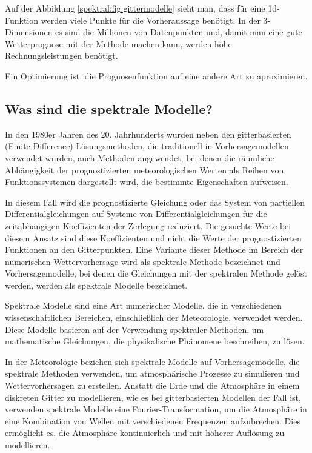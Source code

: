 Auf der Abbildung \ref{spektral:fig:gittermodelle} sieht man, dass für eine 1d-Funktion werden viele Punkte für die Vorheraussage benötigt. In der 3-Dimensionen es sind die Millionen von Datenpunkten und, damit man eine gute Wetterprognose mit der Methode machen kann, werden höhe Rechnungsleistungen benötigt.

Ein Optimierung ist, die Prognosenfunktion auf eine andere Art zu aproximieren.

\subsection{Was sind die spektrale Modelle?
\label{spektral:subsection:spektralemodelle}}
In den 1980er Jahren des 20. Jahrhunderts wurden neben den gitterbasierten (Finite-Difference) Lösungsmethoden, die traditionell in Vorhersagemodellen verwendet wurden, auch Methoden angewendet, bei denen die räumliche Abhängigkeit der prognostizierten meteorologischen Werten als Reihen von Funktionssystemen dargestellt wird, die bestimmte Eigenschaften aufweisen.

In diesem Fall wird die prognostizierte Gleichung oder das System von partiellen Differentialgleichungen auf Systeme von Differentialgleichungen für die zeitabhängigen Koeffizienten der Zerlegung reduziert.
Die gesuchte Werte bei diesem Ansatz sind diese Koeffizienten und nicht die Werte der prognostizierten Funktionen an den Gitterpunkten. 
Eine Variante dieser Methode im Bereich der numerischen Wettervorhersage wird als spektrale Methode bezeichnet und Vorhersagemodelle, bei denen die Gleichungen mit der spektralen Methode gelöst werden, werden als spektrale Modelle bezeichnet.

Spektrale Modelle sind eine Art numerischer Modelle, die in verschiedenen wissenschaftlichen Bereichen, einschließlich der Meteorologie, verwendet werden.
Diese Modelle basieren auf der Verwendung spektraler Methoden, um mathematische Gleichungen, die physikalische Phänomene beschreiben, zu lösen.

In der Meteorologie beziehen sich spektrale Modelle auf Vorhersagemodelle, die spektrale Methoden verwenden, um atmosphärische Prozesse zu simulieren und Wettervorhersagen zu erstellen.
Anstatt die Erde und die Atmosphäre in einem diskreten Gitter zu modellieren, wie es bei gitterbasierten Modellen der Fall ist, verwenden spektrale Modelle eine Fourier-Transformation, um die Atmosphäre in eine Kombination von Wellen mit verschiedenen Frequenzen aufzubrechen.
Dies ermöglicht es, die Atmosphäre kontinuierlich und mit höherer Auflösung zu modellieren.

